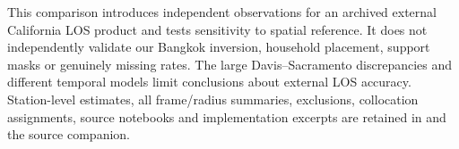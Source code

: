 \documentclass[10pt,a4paper]{article}
\begin{document}
This comparison introduces independent observations for an archived external California LOS product and tests sensitivity to spatial reference. It does not independently validate our Bangkok inversion, household placement, support masks or genuinely missing rates. The large Davis--Sacramento discrepancies and different temporal models limit conclusions about external LOS accuracy. Station-level estimates, all frame/radius summaries, exclusions, collocation assignments, source notebooks and implementation excerpts are retained in  and the source companion.




\small\setlength{\bibsep}{0pt}
\end{document}

